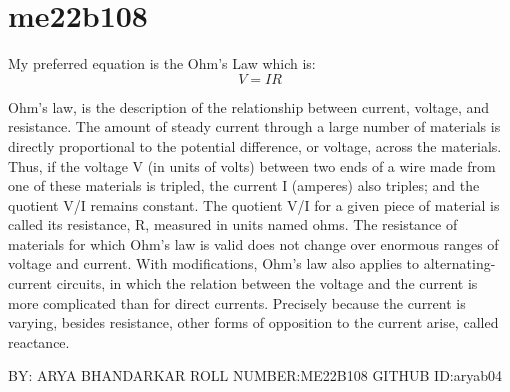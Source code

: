 \section{me22b108}
My preferred equation is the Ohm's Law which is:
\begin{equation}
    V=IR
\end{equation}

Ohm’s law, is the description of the relationship between current, voltage, and resistance. The amount of steady current through a large number of materials is directly proportional to the potential difference, or voltage, across the materials.
Thus, if the voltage V (in units of volts) between two ends of a wire made from one of these materials is tripled, the current I (amperes) also triples; and the quotient V/I remains constant. The quotient V/I for a given piece of material is called its resistance, R, measured in units named ohms. The resistance of materials for which Ohm’s law is valid does not change over enormous ranges of voltage and current.
With modifications, Ohm’s law also applies to alternating-current circuits, in which the relation between the voltage and the current is more complicated than for direct currents. Precisely because the current is varying, besides resistance, other forms of opposition to the current arise, called reactance. 

BY: ARYA BHANDARKAR
ROLL NUMBER:ME22B108
GITHUB ID:aryab04

